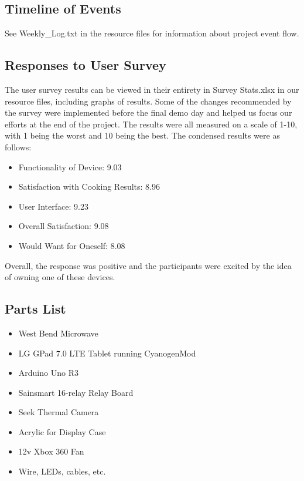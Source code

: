 \documentclass[10pt,journal,letterpaper,twocolumn]{IEEEtran}
\begin{document}
\subsection*{Timeline of Events}
See Weekly\_Log.txt in the resource files for information about project event flow.

\subsection*{Responses to User Survey}
The user survey results can be viewed in their entirety in Survey Stats.xlsx in our resource files, including graphs of results. Some of the changes recommended by the survey were implemented before the final demo day and helped us focus our efforts at the end of the project. The results were all measured on a scale of 1-10, with 1 being the worst and 10 being the best. The condensed results were as follows: 
\begin{itemize}
	\item Functionality of Device: 9.03
	\item Satisfaction with Cooking Results: 8.96
	\item User Interface: 9.23
	\item Overall Satisfaction: 9.08
	\item Would Want for Oneself: 8.08
\end{itemize}
Overall, the response was positive and the participants were excited by the idea of owning one of these devices.

\subsection*{Parts List}
\begin{itemize}
	\item West Bend Microwave
	\item LG GPad 7.0 LTE Tablet running CyanogenMod
	\item Arduino Uno R3
	\item Sainsmart 16-relay Relay Board
	\item Seek Thermal Camera
    \item Acrylic for Display Case
    \item 12v Xbox 360 Fan
    \item Wire, LEDs, cables, etc.
\end{itemize}
\end{document}
